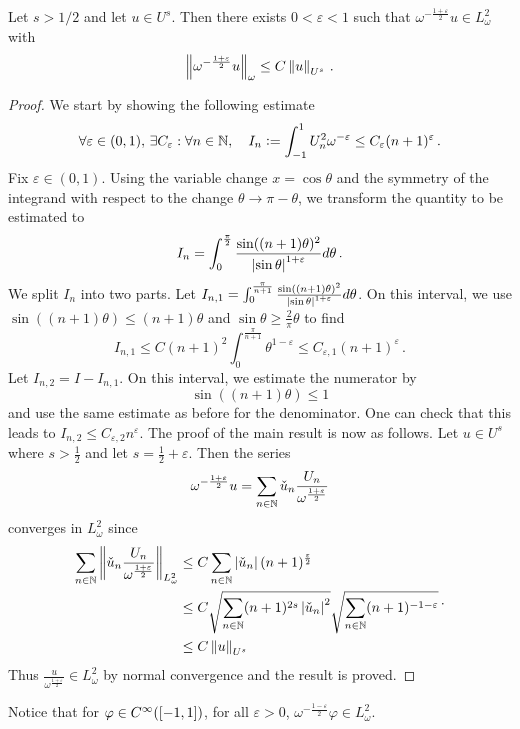 \documentclass[a4paper]{article}
\begin{document}
\begin{Lem}
	Let $s > 1/2$ and let $u \in U^{s}$. Then there exists $0 < \varepsilon < 1$ such that ${\omega^{-\frac{1 + \varepsilon}{2}}}u \in L^2_\omega$ with 
	\[\left\|\omega^{-\frac{1 + \varepsilon}{2}}u\right\|_\omega \leq C \left\|u\right\|_{U^s}\,.\]
	\begin{proof}
		We start by showing the following estimate
		\[\forall \varepsilon \in (0, 1),  \, \exists C_\varepsilon : \forall n \in \mathbb{N}, \quad I_n \mathrel{\mathop:}= \int_{-1}^{1} U_n^2 \omega^{-\varepsilon} \leq C_\varepsilon (n+1)^{\varepsilon}\,.\]
		Fix $ \varepsilon \in (0,1)$. Using the variable change $x = \cos\theta$ and the symmetry of the integrand with respect to the change $\theta \to \pi - \theta$, we transform the quantity to be estimated to
		\[I_{n} = \int_{0}^{\frac{\pi}{2}} \frac{\sin((n+1)\theta)^2}{\left\lvert \sin\theta \right\rvert^{1 + \varepsilon}}d\theta\,.\]
		We split $I_n$ into two parts. Let $I_{n,1} =  \int_{0}^{\frac{\pi}{n+1}} \frac{\sin((n+1)\theta)^2}{\left\lvert \sin\theta \right\rvert^{1 + \varepsilon}}d\theta$. On this interval, we use $\sin((n+1)\theta) \leq (n+1)\theta$ and $\sin\theta \geq \frac{2}{\pi}\theta$ to find 
		\[I_{n,1} \leq C (n+1)^2\int_{0}^{\frac{\pi}{n+1}} \theta^{1 - \varepsilon} \leq C_{\varepsilon,1} (n+1)^{\varepsilon}\,.\]
		Let $I_{n,2} = I - I_{n,1}$. On this interval, we estimate the numerator by 
		\[\sin((n+1)\theta) \leq 1\] 
		and use the same estimate as before for the denominator. One can check that this leads to $I_{n,2} \leq C_{\varepsilon,2}n^{\varepsilon}$. The proof of the main result is now as follows. Let $u \in U^s$ where $s > \frac{1}{2}$ and let $s = \frac{1}{2} + \varepsilon$. Then the series 
		\[{\omega^{-\frac{1 + \varepsilon}{2}}}u = \sum_{n \in \mathbb{N}} \check{u}_n \frac{U_n}{\omega^{\frac{1 +\varepsilon}{2}}}\]
		converges in $L^2_\omega$ since 
		\[\begin{split}
		\sum_{n \in \mathbb{N}} \left\|\check{u}_n \frac{U_n}{\omega^{\frac{1+\varepsilon}{2}}}\right\|_{L^2_\omega} &\leq C \sum_{n \in \mathbb{N}} \left\lvert \check{u}_n \right\rvert (n+1)^{\frac{\varepsilon}{2}}\\
		&\leq C \sqrt{\sum_{n\in \mathbb{N}}(n+1)^{2s}\left\lvert \check{u}_n \right\rvert^2} \sqrt{\sum_{n\in \mathbb{N}}(n+1)^{-1 - \varepsilon}}\\
		&\leq C \left\|u\right\|_{U^s}\end{split}\,.\]
		Thus $\frac{u}{\omega^{\frac{1 + \varepsilon}{2}}} \in L^2_\omega$ by normal convergence and the result is proved. 
	\end{proof} 
\end{Lem}
\noindent Notice that for $\varphi \in C^{\infty}([-1,1])$, for all $\varepsilon > 0$, ${\omega^{-\frac{1-\varepsilon}{2}}} \varphi \in L^2_\omega$. 
\end{document}
